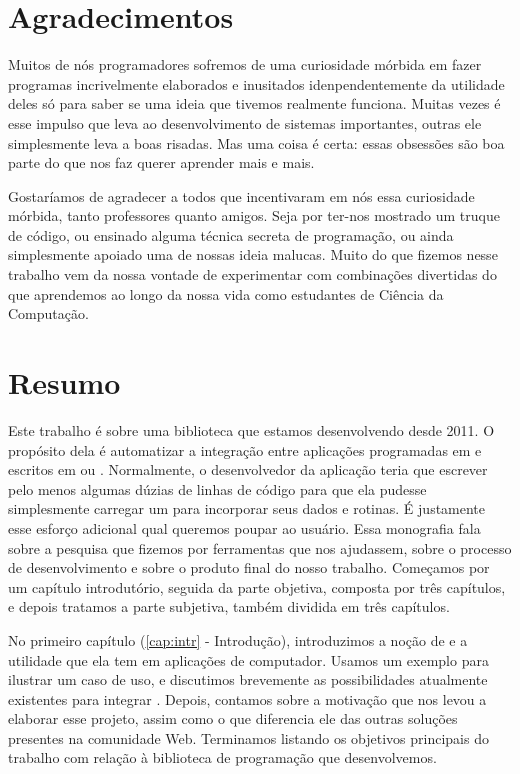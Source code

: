 \documentclass[11pt,twoside,a4paper]{book}
\begin{document}
\chapter*{Agradecimentos}

Muitos de nós programadores sofremos de uma curiosidade mórbida em fazer
programas incrivelmente elaborados e inusitados idenpendentemente da utilidade
deles só para saber se uma ideia que tivemos realmente funciona. Muitas vezes é
esse impulso que leva ao desenvolvimento de sistemas importantes, outras ele
simplesmente leva a boas risadas. Mas uma coisa é certa: essas obsessões são boa
parte do que nos faz querer aprender mais e mais.

Gostaríamos de agradecer a todos que incentivaram em nós essa curiosidade
mórbida, tanto professores quanto amigos. Seja por ter-nos mostrado um truque
de código, ou ensinado alguma técnica secreta de programação, ou ainda
simplesmente apoiado uma de nossas ideia malucas. Muito do que fizemos nesse
trabalho vem da nossa vontade de experimentar com combinações divertidas do que
aprendemos ao longo da nossa vida como estudantes de Ciência da Computação.

\chapter*{Resumo}

Este trabalho é sobre uma biblioteca \CXX{} que estamos desenvolvendo desde
2011. O propósito dela é automatizar a integração entre aplicações programadas
em \CXX{} e  escritos em  ou . Normalmente,
o desenvolvedor da aplicação teria que escrever pelo menos algumas dúzias
de linhas de código para que ela pudesse simplesmente carregar um \script{}
para incorporar seus dados e rotinas. É justamente esse esforço adicional
qual queremos poupar ao usuário. Essa monografia fala sobre a pesquisa que
fizemos por ferramentas que nos ajudassem, sobre o processo de desenvolvimento
e sobre o produto final do nosso trabalho. Começamos por um capítulo introdutório,
seguida da parte objetiva, composta por três capítulos, e depois tratamos
a parte subjetiva, também dividida em três capítulos.

No primeiro capítulo (\ref{cap:intr} - Introdução), introduzimos a noção de
 e a utilidade que ela tem em aplicações de computador. Usamos um
exemplo para ilustrar um caso de uso, e discutimos brevemente as possibilidades
atualmente existentes para integrar . Depois, contamos sobre a
motivação que nos levou a elaborar esse projeto, assim como o que diferencia
ele das outras soluções presentes na comunidade Web. Terminamos listando os
objetivos principais do trabalho com relação à biblioteca de programação
que desenvolvemos.
\end{document}

